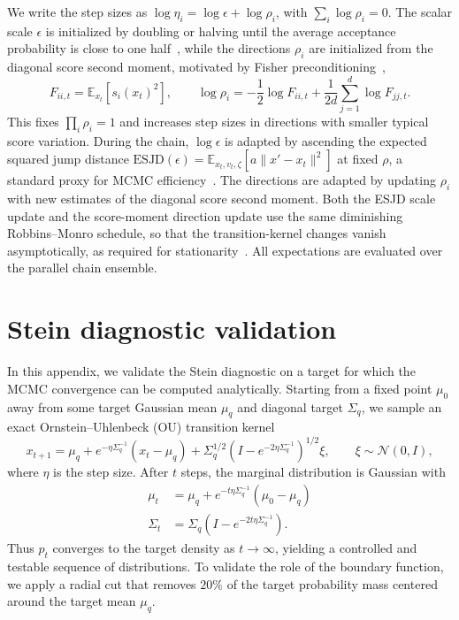 \documentclass{article}
\begin{document}
We write the step sizes as $\log\eta_i=\log\epsilon+\log\rho_i$, with $\sum_i\log\rho_i=0$.
The scalar scale $\epsilon$ is initialized by doubling or halving until the average acceptance probability is close to one half~\cite{hoffman2014no}, while the directions $\rho_i$ are initialized from the diagonal score second moment, motivated by Fisher preconditioning~\cite{girolami2011riemann,Titsias:2023},
\begin{equation}
  F_{ii,t} = \mathbb{E}_{x_t}\left[s_i(x_t)^2\right],
  \qquad
  \log\rho_i = -\frac{1}{2}\log F_{ii,t} + \frac{1}{2d}\sum_{j=1}^d \log F_{jj,t}.
\end{equation}
This fixes $\prod_i\rho_i=1$ and increases step sizes in directions with smaller typical score variation.
During the chain, $\log\epsilon$ is adapted by ascending the expected squared jump distance $\mathrm{ESJD}(\epsilon)= \mathbb{E}_{x_t,v_t,\zeta}\left[a \lVert x' - x_t \rVert^2\right]$ at fixed $\rho$, a standard proxy for MCMC efficiency~\cite{gelman1997weak,pasarica2010adaptively}.
The directions are adapted by updating $\rho_i$ with new estimates of the diagonal score second moment.
Both the ESJD scale update and the score-moment direction update use the same diminishing Robbins--Monro schedule, so that the transition-kernel changes vanish asymptotically, as required for stationarity~\cite{robbins1951stochastic,Roberts:2007adaptive}.
All expectations are evaluated over the parallel chain ensemble.

\section{Stein diagnostic validation}
\label{app:validation}
In this appendix, we validate the Stein diagnostic on a target for which the MCMC convergence can be computed analytically.
Starting from a fixed point $\mu_0$ away from some target Gaussian mean $\mu_q$ and diagonal target $\Sigma_q$, we sample an exact Ornstein--Uhlenbeck (OU) transition kernel
\begin{equation}
  x_{t+1} = \mu_q + e^{-\eta \Sigma_q^{-1}}(x_t-\mu_q) + \Sigma_q^{1/2} \left(I-e^{-2\eta\Sigma_q^{-1}}\right)^{1/2}\xi, \qquad \xi\sim\mathcal{N}(0,I),
\end{equation}
where $\eta$ is the step size.
After $t$ steps, the marginal distribution is Gaussian with
\begin{align}
  \mu_t &= \mu_q + e^{-t\eta\Sigma_q^{-1}}(\mu_0-\mu_q) \nonumber \\
  \Sigma_t &= \Sigma_q\left(I-e^{-2t\eta\Sigma_q^{-1}}\right).
\end{align}
Thus $p_t$ converges to the target density as $t\to\infty$, yielding a controlled and testable sequence of distributions.
To validate the role of the boundary function, we apply a radial cut that removes $20\%$ of the target probability mass centered around the target mean $\mu_q$.
\end{document}
